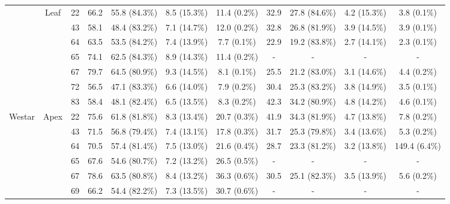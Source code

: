 \documentclass[12pt,]{book}
\begin{document}
\begin{sidewaystable}[htp]
\begin{center}
{\begin{tabular}{ccccccccccc}
\cmidrule(lr){2-11}
                          & \multirow{7}{*}{Leaf} & 22 & 66.2 & 55.8 (84.3\%) &  8.5 (15.3\%) & 11.4 (0.2\%) & 32.9 & 27.8 (84.6\%) & 4.2 (15.3\%) &   3.8 (0.1\%) \\
                          &                       & 43 & 58.1 & 48.4 (83.2\%) &  7.1 (14.7\%) & 12.0 (0.2\%) & 32.8 & 26.8 (81.9\%) & 3.9 (14.5\%) &   3.9 (0.1\%) \\
                          &                       & 64 & 63.5 & 53.5 (84.2\%) &  7.4 (13.9\%) &  7.7 (0.1\%) & 22.9 & 19.2 (83.8\%) & 2.7 (14.1\%) &   2.3 (0.1\%) \\
                          &                       & 65 & 74.1 & 62.5 (84.3\%) &  8.9 (14.3\%) & 11.4 (0.2\%) &    - &            - &           - &            - \\
                          &                       & 67 & 79.7 & 64.5 (80.9\%) &  9.3 (14.5\%) &  8.1 (0.1\%) & 25.5 & 21.2 (83.0\%) & 3.1 (14.6\%) &   4.4 (0.2\%) \\
                          &                       & 72 & 56.5 & 47.1 (83.3\%) &  6.6 (14.0\%) &  7.9 (0.2\%) & 30.4 & 25.3 (83.2\%) & 3.8 (14.9\%) &   3.5 (0.1\%) \\
                          &                       & 83 & 58.4 & 48.1 (82.4\%) &  6.5 (13.5\%) &  8.3 (0.2\%) & 42.3 & 34.2 (80.9\%) & 4.8 (14.2\%) &   4.6 (0.1\%) \\
\cmidrule(lr){1-11}
\multirow{14}{*}{Westar}  & \multirow{7}{*}{Apex} & 22 & 75.6 & 61.8 (81.8\%) &  8.3 (13.4\%) & 20.7 (0.3\%) & 41.9 & 34.3 (81.9\%) & 4.7 (13.8\%) &   7.8 (0.2\%) \\
                          &                       & 43 & 71.5 & 56.8 (79.4\%) &  7.4 (13.1\%) & 17.8 (0.3\%) & 31.7 & 25.3 (79.8\%) & 3.4 (13.6\%) &   5.3 (0.2\%) \\
                          &                       & 64 & 70.5 & 57.4 (81.4\%) &  7.5 (13.0\%) & 21.6 (0.4\%) & 28.7 & 23.3 (81.2\%) & 3.2 (13.8\%) & 149.4 (6.4\%) \\
                          &                       & 65 & 67.6 & 54.6 (80.7\%) &  7.2 (13.2\%) & 26.5 (0.5\%) &    - &            - &           - &            - \\
                          &                       & 67 & 78.6 & 63.5 (80.8\%) &  8.4 (13.2\%) & 36.3 (0.6\%) & 30.5 & 25.1 (82.3\%) & 3.5 (13.9\%) &   5.6 (0.2\%) \\
                          &                       & 69 & 66.2 & 54.4 (82.2\%) &  7.3 (13.5\%) & 30.7 (0.6\%) &    - &            - &           - &            - \\

\end{tabular}}
\end{center}
\end{sidewaystable}
\end{document}
